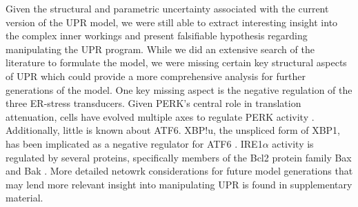 \documentclass[fleqn,10pt]{wlscirep}
\begin{document}
Given the structural and parametric uncertainty associated with the current version of the UPR model, we were still able to extract interesting insight into the complex inner workings and present falsifiable hypothesis regarding manipulating the UPR program. While we did an extensive search of the literature to formulate the model, we were missing certain key structural aspects of UPR which could provide a more comprehensive analysis for further generations of the model. One key missing aspect is the negative regulation of the three ER-stress transducers. Given PERK's central role in translation attenuation, cells have evolved multiple axes to regulate PERK activity \cite{Lee:1990ye}. Additionally, little is known about ATF6. XBP!u, the unspliced form of XBP1, has been implicated as a negative regulator for ATF6 \cite{Yoshida:2009bs}. IRE1$\alpha$ activity is regulated by several proteins, specifically members of the Bcl2 protein family Bax and Bak \cite{Hetz:2006qf}. More detailed netowrk considerations for future model generations that may lend more relevant insight into manipulating UPR is found in supplementary material. 
\end{document}

